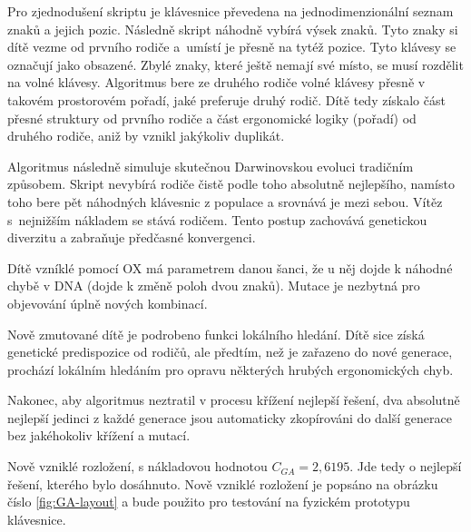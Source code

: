 \documentclass[a4paper, twoside, 12pt, czech]{article}
\begin{document}
Pro zjednodušení skriptu je klávesnice převedena na jednodimenzionální sez\-nam znaků a jejich pozic.
Následně skript náhodně vybírá výsek znaků. Tyto znaky si dítě vezme od prvního rodiče a~umístí
je přesně na tytéž pozice. Tyto klávesy se označují jako obsazené. Zbylé znaky, 
které ještě nemají své místo, se musí rozdělit na volné klávesy. Algoritmus 
bere ze druhého rodiče volné klávesy přesně v takovém prostorovém pořadí, jaké preferuje
druhý rodič. Dítě tedy získalo část přesné struktury od prvního rodiče a část
ergonomické logiky (pořadí) od druhého rodiče, aniž by vznikl jakýkoliv duplikát.

Algoritmus následně simuluje skutečnou Darwinovskou evoluci tradičním způ\-sobem.
Skript nevybírá rodiče čistě podle toho absolutně nejlepšího, namísto toho bere pět náhodných 
klávesnic z populace a srovnává je mezi sebou. Vítěz s~nejnižším nákladem se stává rodičem.
Tento postup zachovává genetickou diverzitu a zabraňuje předčasné konvergenci. 

Dítě vzníklé pomocí OX má parametrem danou šanci, že u něj dojde k náhodné chybě v DNA 
(dojde k změně poloh dvou znaků). Mutace je nezbytná pro objevování úplně nových kombinací.

Nově zmutované dítě je podrobeno funkci lokálního hledání. Dítě sice získá genetické predispozice
od rodičů, ale předtím, než je zařazeno do nové generace, prochází lokálním hledáním pro 
opravu některých hrubých ergonomických chyb.

Nakonec, aby algoritmus neztratil v procesu křížení nejlepší řešení, dva absolutně 
nejlepší jedinci z každé generace jsou automaticky zkopírováni do další generace bez
jakéhokoliv křížení a mutací.

Nově vzniklé rozložení, s nákladovou hodnotou $C_{GA}=2,6195$. Jde tedy o nejlepší 
řešení, kterého bylo dosáhnuto. Nově vzniklé rozložení je popsáno na obráz\-ku číslo \ref{fig:GA-layout} 
a bude použito pro testování na fyzickém prototypu klávesnice.
\end{document}
